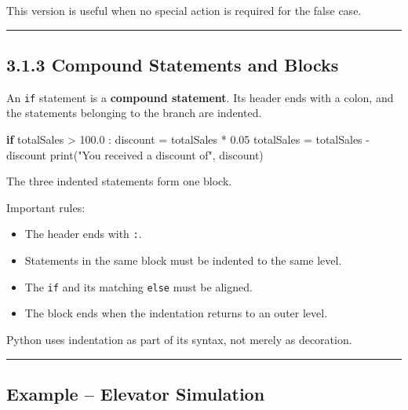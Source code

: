 \documentclass[
  11pt,
  a4paper,
]{article}
\newenvironment{Shaded}{}{}
\newcommand{\BuiltInTok}[1]{\textcolor[rgb]{0.00,0.50,0.00}{#1}}
\newcommand{\ControlFlowTok}[1]{\textcolor[rgb]{0.00,0.44,0.13}{\textbf{#1}}}
\newcommand{\FloatTok}[1]{\textcolor[rgb]{0.25,0.63,0.44}{#1}}
\newcommand{\NormalTok}[1]{#1}
\newcommand{\OperatorTok}[1]{\textcolor[rgb]{0.40,0.40,0.40}{#1}}
\newcommand{\StringTok}[1]{\textcolor[rgb]{0.25,0.44,0.63}{#1}}
\providecommand{\tightlist}{%
  \setlength{\itemsep}{0pt}\setlength{\parskip}{0pt}}
\begin{document}
This version is useful when no special action is required for the false
case.

\begin{center}\rule{0.5\linewidth}{0.5pt}\end{center}

\subsection{3.1.3 Compound Statements and
Blocks}\label{compound-statements-and-blocks}

An \texttt{if} statement is a \textbf{compound statement}. Its header
ends with a colon, and the statements belonging to the branch are
indented.

\begin{Shaded}
\begin{Highlighting}[]
\ControlFlowTok{if}\NormalTok{ totalSales }\OperatorTok{\textgreater{}} \FloatTok{100.0}\NormalTok{ :}
\NormalTok{    discount }\OperatorTok{=}\NormalTok{ totalSales }\OperatorTok{*} \FloatTok{0.05}
\NormalTok{    totalSales }\OperatorTok{=}\NormalTok{ totalSales }\OperatorTok{{-}}\NormalTok{ discount}
    \BuiltInTok{print}\NormalTok{(}\StringTok{"You received a discount of"}\NormalTok{, discount)}
\end{Highlighting}
\end{Shaded}

The three indented statements form one block.

Important rules:

\begin{itemize}
\tightlist
\item
  The header ends with \texttt{:}.
\item
  Statements in the same block must be indented to the same level.
\item
  The \texttt{if} and its matching \texttt{else} must be aligned.
\item
  The block ends when the indentation returns to an outer level.
\end{itemize}

Python uses indentation as part of its syntax, not merely as decoration.

\begin{center}\rule{0.5\linewidth}{0.5pt}\end{center}

\subsection{Example -- Elevator
Simulation}\label{example-elevator-simulation}
\end{document}
